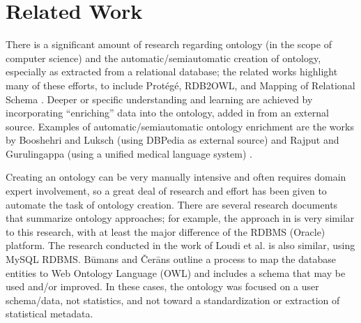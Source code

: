 \documentclass[sigconf]{acmart}
\begin{document}
\section{Related Work}
There is a significant amount of research regarding ontology (in the scope of computer science) and the automatic/semiautomatic creation of ontology, especially as extracted from a relational database; the related works highlight many of these efforts, to include Protégé, RDB2OWL, and Mapping of Relational Schema \cite{christian2017mapping}. Deeper or specific understanding and learning are achieved by incorporating “enriching” data into the ontology, added in from an external source. Examples of automatic/semiautomatic ontology enrichment are the works by Booshehri and Luksch (using DBPedia as external source) \cite{booshehri2015ontology} and Rajput and Gurulingappa (using a unified medical language system) \cite{rajput2013semi}.

Creating an ontology can be very manually intensive and often requires domain expert involvement, so a great deal of research and effort has been given to automate the task of ontology creation. There are several research documents that summarize ontology approaches; for example, the approach in \cite{christian2017mapping} is very similar to this research, with at least the major difference of the RDBMS (Oracle) platform. The research conducted in the work of Loudi et al. \cite{louhdi2013hybrid} is also similar, using MySQL RDBMS. Būmans and Čerāns \cite{bumans2018rdb2owl} outline a process to map the database entities to Web Ontology Language (OWL) and includes a schema that may be used and/or improved. In these cases, the ontology was focused on a user schema/data, not statistics, and not toward a standardization or extraction of statistical metadata. 

\end{document}
